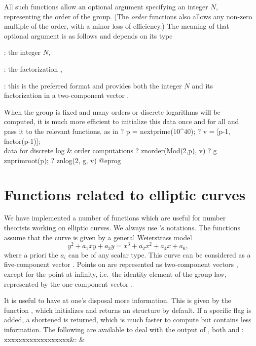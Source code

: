 All such functions allow an optional argument specifying an integer
$N$, representing the order of the group. (The \emph{order} functions also
allows any non-zero multiple of the order, with a minor loss of efficiency.)
The meaning of that optional argument is as follows and depends on its type

\item {}: the integer $N$,

\item {}: the factorization ,

\item {}: this is the preferred format and provides both the
integer $N$ and its factorization in a two-component vector \kbd{[$N$,
fa]}.

When the group is fixed and many orders or discrete logarithms will be
computed, it is much more efficient to initialize this data once and for all
and pass it to the relevant functions, as in
\bprog
? p = nextprime(10^40);
? v = [p-1, factor(p-1)]; \\ data for discrete log & order computations
? znorder(Mod(2,p), v)
? g = znprimroot(p);
? znlog(2, g, v)
@eprog
\bigskip


\section{Functions related to elliptic curves}

We have implemented a number of functions which are useful for number
theorists working on elliptic curves. We always use 's notations.
The functions assume that the curve is given by a general Weierstrass
model
$$
  y^2+a_1xy+a_3y=x^3+a_2x^2+a_4x+a_6,
$$
where a priori the $a_i$ can be of any scalar type. This curve can be
considered as a five-component vector . Points on
 are represented as two-component vectors \kbd{[x,y]}, except for the
point at infinity, i.e.~the identity element of the group law, represented by
the one-component vector \kbd{[0]}.

  It is useful to have at one's disposal more information. This is given by
the function , which initializes and returns an
 structure by default. If a specific flag is added, a
shortened  is returned, which is much
faster to compute but contains less information. The following  are available to deal with the output of ,
both  and :
\settabs\+xxxxxxxxxxxxxxxxxx&: &\cr

